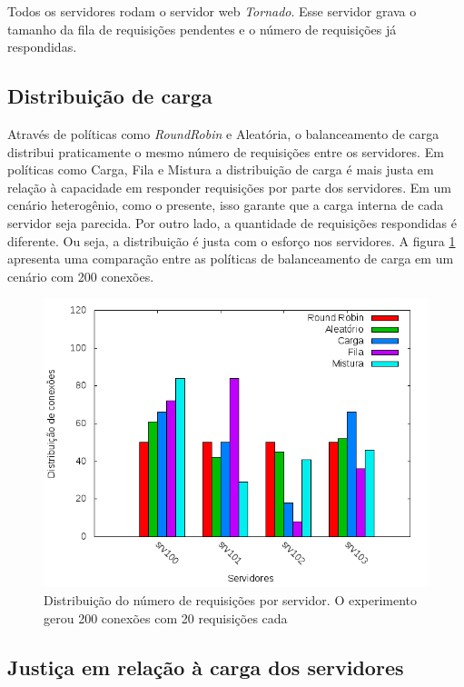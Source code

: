 Todos os servidores rodam o servidor web \emph{Tornado}\citep{tornado}. 
Esse servidor grava o tamanho da fila de requisições pendentes e o número de 
requisições já respondidas.


\subsection{Distribuição de carga}

Através de políticas como \emph{RoundRobin} e Aleatória, o balanceamento de 
carga distribui praticamente o mesmo número de requisições entre
os servidores.
Em políticas como Carga, Fila e Mistura a distribuição de carga é mais justa
em relação à capacidade em responder requisições por parte dos servidores.
Em um cenário heterogênio, como o presente, isso garante que a carga interna
de cada servidor seja parecida.
Por outro lado, a quantidade de requisições respondidas é diferente.
Ou seja, a distribuição é justa com o esforço nos servidores.
A figura \ref{fig:balancer-distribution} apresenta uma comparação entre as 
políticas de balanceamento de carga em um cenário com 200 conexões.

\begin{figure}[htb!]
    \centering
    \includegraphics[scale=0.7]{img/balancer-distribution.png}
    \caption{Distribuição do número de requisições por servidor. O experimento
    gerou 200 conexões com 20 requisições cada}
    \label{fig:balancer-distribution}
\end{figure}

\subsection{Justiça em relação à carga dos servidores}

